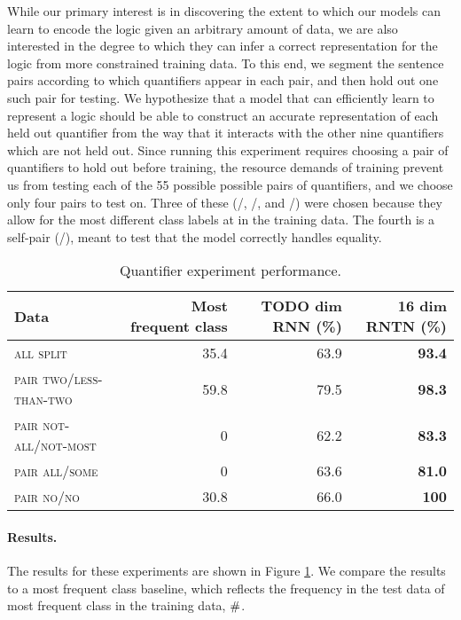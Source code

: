While our primary interest is in discovering the extent to which our
models can learn to encode the logic given an arbitrary amount of
data, we are also interested in the degree to which they can infer a
correct representation for the logic from more constrained training
data. To this end, we segment the sentence pairs according to which
quantifiers appear in each pair, and then hold out one such pair for
testing. We hypothesize that a model that can efficiently learn to
represent a logic should be able to construct an accurate
representation of each held out quantifier from the way that it
interacts with the other nine quantifiers which are not held
out. Since running this experiment requires choosing a pair of
quantifiers to hold out before training, the resource demands of
training prevent us from testing each of the 55 possible possible
pairs of quantifiers, and we choose only four pairs to test on.  Three
of these (/, /, and
/) were chosen because they allow for the most
different class labels at in the training data. The fourth is a
self-pair (/), meant to test that the model correctly
handles equality.


\begin{table}[htp]
  \centering
  \begin{tabular}{ l rrr }
    \toprule
    Data & Most frequent class & TODO dim RNN (\%) & 16 dim RNTN (\%)\\
    \midrule
    \textsc{all split}	& 35.4 &	63.9&	\textbf{93.4}
    \\[1ex]    
    \textsc{pair two/less-than-two}	& 59.8 &	79.5 &	\textbf{98.3} \\
    \textsc{pair not-all/not-most}	&0 &	   62.2  &	\textbf{83.3} \\
    \textsc{pair all/some}	& 0& 63.6  &	\textbf{81.0} \\
    \textsc{pair no/no}	& 30.8 &	66.0 &	\textbf{100} \\
    \bottomrule
  \end{tabular}
  \caption{Quantifier experiment performance. }
  \label{resultstable}
\end{table} 


\paragraph{Results.} The results for these experiments are shown in Figure \ref{resultstable}. We compare the results to a most frequent class baseline, which reflects the frequency in the test data of most frequent class in the training data, $\mathbin{\#}$.


